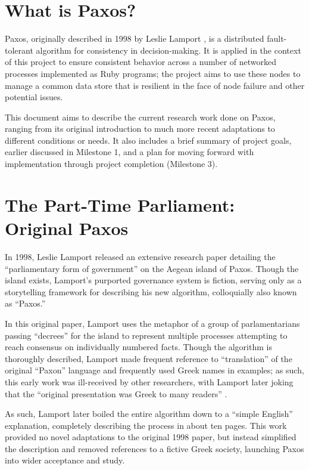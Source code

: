 \documentclass{article}
\begin{document}

\section{What is Paxos?}

Paxos, originally described in 1998 by Leslie Lamport \cite{paxos}, is a distributed fault-tolerant algorithm for consistency in decision-making. It is applied in the context of this project to ensure consistent behavior across a number of networked processes implemented as Ruby programs; the project aims to use these nodes to manage a common data store that is resilient in the face of node failure and other potential issues.

This document aims to describe the current research work done on Paxos, ranging from its original introduction to much more recent adaptations to different conditions or needs. It also includes a brief summary of project goals, earlier discussed in Milestone 1, and a plan for moving forward with implementation through project completion (Milestone 3).

\section{The Part-Time Parliament: Original Paxos}

In 1998, Leslie Lamport released an extensive research paper detailing the ``parliamentary form of government'' on the Aegean island of Paxos. Though the island exists, Lamport's purported governance system is fiction, serving only as a storytelling framework for describing his new algorithm, colloquially also known as ``Paxos.''

In this original paper, Lamport uses the metaphor of a group of parlamentarians passing ``decrees'' for the island to represent multiple processes attempting to reach consensus on individually numbered facts. Though the algorithm is thoroughly described, Lamport made frequent reference to ``translation'' of the original ``Paxon'' language and frequently used Greek names in examples; as such, this early work was ill-received by other researchers, with Lamport later joking that the ``original presentation was Greek to many readers'' \cite{simple-paxos}.

As such, Lamport later boiled the entire algorithm down to a ``simple English'' explanation, completely describing the process in about ten pages. This work provided no novel adaptations to the original 1998 paper, but instead simplified the description and removed references to a fictive Greek society, launching Paxos into wider acceptance and study.
\end{document}

